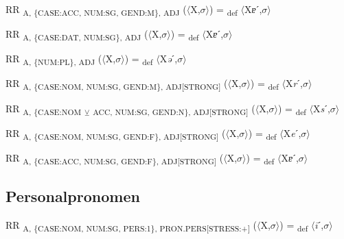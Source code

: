{\begin{exe}
 RR \textsubscript{A, \{CASE:ACC, NUM:SG, GEND:M\}, ADJ} ($\langle$X,$\sigma $$\rangle$) = \textsubscript{def} $\langle$X\textit{ɐ}ˊ,$\sigma $$\rangle$
\end{exe}

\begin{exe}
 RR \textsubscript{A, \{CASE:DAT, NUM:SG\}, ADJ} ($\langle$X,$\sigma $$\rangle$) = \textsubscript{def} $\langle$X\textit{ɐ}ˊ,$\sigma $$\rangle$
\end{exe}

\begin{exe}
 RR \textsubscript{A, \{NUM:PL\}, ADJ} ($\langle$X,$\sigma $$\rangle$) = \textsubscript{def} $\langle$X\textit{ə}ˊ,$\sigma $$\rangle$
\end{exe}

\begin{exe}
 RR \textsubscript{A, \{CASE:NOM, NUM:SG, GEND:M\}, ADJ[STRONG]} ($\langle$X,$\sigma $$\rangle$) = \textsubscript{def} $\langle$X\textit{r}ˊ,$\sigma $$\rangle$
\end{exe}

\begin{exe}
 RR \textsubscript{A, \{CASE:NOM} \textsubscript{${\veebar}$}\textsubscript{ ACC, NUM:SG, GEND:N\}, ADJ[STRONG]} ($\langle$X,$\sigma $$\rangle$) = \textsubscript{def} $\langle$X\textit{s}ˊ,$\sigma $$\rangle$
\end{exe}

\begin{exe}
 RR \textsubscript{A, \{CASE:NOM, NUM:SG, GEND:F\}, ADJ[STRONG]} ($\langle$X,$\sigma $$\rangle$) = \textsubscript{def} $\langle$X\textit{e}ˊ,$\sigma $$\rangle$
\end{exe}

\begin{exe}
 RR \textsubscript{A, \{CASE:ACC, NUM:SG, GEND:F\}, ADJ[STRONG]} ($\langle$X,$\sigma $$\rangle$) = \textsubscript{def} $\langle$X\textit{ɐ}ˊ,$\sigma $$\rangle$
\end{exe}

\subsection{Personalpronomen}

\begin{exe}
 RR \textsubscript{A, \{CASE:NOM, NUM:SG, PERS:1\}, PRON.PERS[STRESS:+]} ($\langle$X,$\sigma $$\rangle$) = \textsubscript{def} $\langle$\textit{\=i}ˊ,$\sigma $$\rangle$
\end{exe}

}
